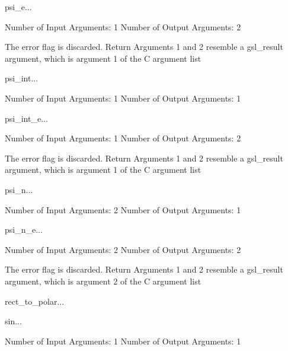 \begin{funcdesc}{psi_e}{...}

    Number of Input  Arguments:  1
    Number of Output Arguments:  2

The error flag is discarded.
Return Arguments 1 and 2 resemble a gsl_result argument,
	which is  argument 1 of the C argument list

\end{funcdesc}

\begin{funcdesc}{psi_int}{...}

    Number of Input  Arguments:  1
    Number of Output Arguments:  1
\end{funcdesc}

\begin{funcdesc}{psi_int_e}{...}

    Number of Input  Arguments:  1
    Number of Output Arguments:  2

The error flag is discarded.
Return Arguments 1 and 2 resemble a gsl_result argument,
	which is  argument 1 of the C argument list

\end{funcdesc}

\begin{funcdesc}{psi_n}{...}

    Number of Input  Arguments:  2
    Number of Output Arguments:  1
\end{funcdesc}

\begin{funcdesc}{psi_n_e}{...}

    Number of Input  Arguments:  2
    Number of Output Arguments:  2

The error flag is discarded.
Return Arguments 1 and 2 resemble a gsl_result argument,
	which is  argument 2 of the C argument list

\end{funcdesc}

\begin{funcdesc}{rect_to_polar}{...}

\end{funcdesc}

\begin{funcdesc}{sin}{...}

    Number of Input  Arguments:  1
    Number of Output Arguments:  1
\end{funcdesc}

